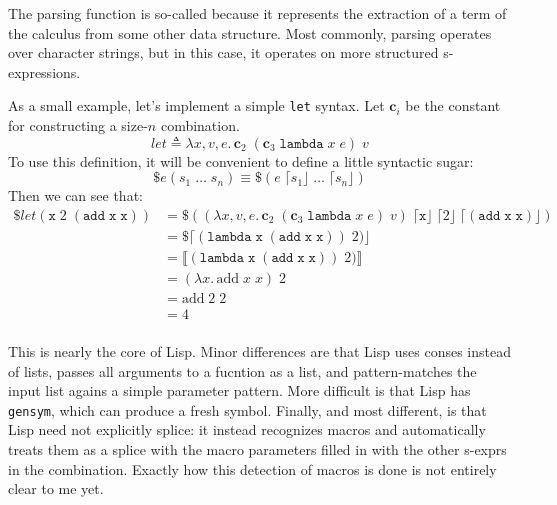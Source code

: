 \documentclass[11pt]{article} %
\theoremstyle{definition}
\theoremstyle{remark}
\begin{document}
The parsing function is so-called because it represents the extraction of a term of the calculus from some other data structure.
Most commonly, parsing operates over character strings, but in this case,
  it operates on more structured s-expressions.

As a small example, let's implement a simple \texttt{let} syntax.
Let $\mathbf c_i$ be the constant for constructing a size-$n$ combination.
  $$let \triangleq \lambda x,v,e.\, \mathbf c_2\;(\mathbf c_3\;\mathtt{lambda}\;x\;e)\;v$$
To use this definition, it will be convenient to define a little syntactic sugar:
  $$\$e(s_1\;\ldots\;s_n) \equiv \$(e\;\lceil s_1 \rfloor\;\ldots\;\lceil s_n \rfloor)$$
Then we can see that:
\begin{align*}
  \$let(\mathtt x\;2\;(\mathtt{add}\;\mathtt x\;\mathtt x))
    &= \$((\lambda x,v,e.\, \mathbf c_2\;(\mathbf c_3\;\mathtt{lambda}\;x\;e)\;v)\;
        \lceil \mathtt x \rfloor\;\lceil 2 \rfloor\;\lceil (\mathtt{add}\;\mathtt x\;\mathtt x) \rfloor) \\
    &= \$\lceil(\mathtt{lambda}\;\mathtt x\;(\mathtt{add}\;\mathtt x\;\mathtt x))\;2)\rfloor \\
    &= \llbracket(\mathtt{lambda}\;\mathtt x\;(\mathtt{add}\;\mathtt x\;\mathtt x))\;2)\rrbracket \\
    &= (\lambda x.\, \mathrm{add}\;x\;x)\;2 \\
    &= \mathrm{add}\;2\;2 \\
    &= 4 \\
\end{align*}

This is nearly the core of Lisp.
Minor differences are that Lisp uses conses instead of lists,
  passes all arguments to a fucntion as a list,
  and pattern-matches the input list agains a simple parameter pattern.
More difficult is that Lisp has \texttt{gensym}, which can produce a fresh symbol.
Finally, and most different, is that Lisp need not explicitly splice:
  it instead recognizes macros and automatically treats them as a splice with the macro parameters filled in with the other s-exprs in the combination.
Exactly how this detection of macros is done is not entirely clear to me yet.
\end{document}
